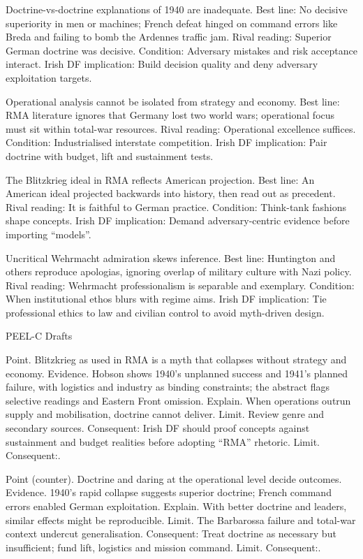 Doctrine-vs-doctrine explanations of 1940 are inadequate.
Best line: No decisive superiority in men or machines; French defeat hinged on command errors like Breda and failing to bomb the Ardennes traffic jam.
Rival reading: Superior German doctrine was decisive.
Condition: Adversary mistakes and risk acceptance interact.
Irish DF implication: Build decision quality and deny adversary exploitation targets.

Operational analysis cannot be isolated from strategy and economy.
Best line: RMA literature ignores that Germany lost two world wars; operational focus must sit within total-war resources.
Rival reading: Operational excellence suffices.
Condition: Industrialised interstate competition.
Irish DF implication: Pair doctrine with budget, lift and sustainment tests.

The Blitzkrieg ideal in RMA reflects American projection.
Best line: An American ideal projected backwards into history, then read out as precedent.
Rival reading: It is faithful to German practice.
Condition: Think-tank fashions shape concepts.
Irish DF implication: Demand adversary-centric evidence before importing “models”.

Uncritical Wehrmacht admiration skews inference.
Best line: Huntington and others reproduce apologias, ignoring overlap of military culture with Nazi policy.
Rival reading: Wehrmacht professionalism is separable and exemplary.
Condition: When institutional ethos blurs with regime aims.
Irish DF implication: Tie professional ethics to law and civilian control to avoid myth-driven design.

PEEL-C Drafts

Point. Blitzkrieg as used in RMA is a myth that collapses without strategy and economy.
Evidence. Hobson shows 1940’s unplanned success and 1941’s planned failure, with logistics and industry as binding constraints; the abstract flags selective readings and Eastern Front omission.
Explain. When operations outrun supply and mobilisation, doctrine cannot deliver.
Limit. Review genre and secondary sources. Consequent: Irish DF should proof concepts against sustainment and budget realities before adopting “RMA” rhetoric. Limit. Consequent:.

Point (counter). Doctrine and daring at the operational level decide outcomes.
Evidence. 1940’s rapid collapse suggests superior doctrine; French command errors enabled German exploitation.
Explain. With better doctrine and leaders, similar effects might be reproducible.
Limit. The Barbarossa failure and total-war context undercut generalisation. Consequent: Treat doctrine as necessary but insufficient; fund lift, logistics and mission command. Limit. Consequent:.

